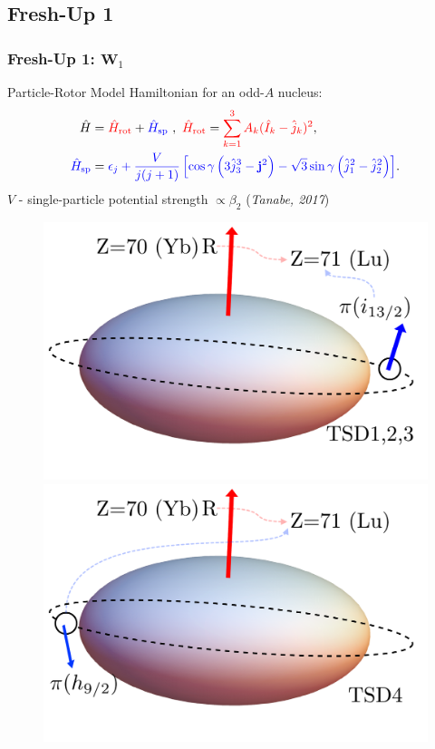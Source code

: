 \documentclass{beamer}
\begin{document}
\subsection{Fresh-Up 1}

\begin{frame}
	\frametitle{Fresh-Up 1: $\mathbf{W}_1$}
	\vspace{-0.1cm}
	Particle-Rotor Model Hamiltonian for an odd-$A$ nucleus:	
	\vspace{-0.28cm}
	\begin{align}
		\hat{H}&={\color{red}\hat{H}_\text{rot}}+{\color{blue}\hat{H}_\text{sp}}\ ,\ {\color{red}\hat{H}_\text{rot}}={\color{red}\sum_{k=1}^3A_k(\hat{I}_k-\hat{j}_k)^2},\nonumber\\
		{\color{blue}\hat{H}_\text{sp}}&={\color{blue}\epsilon_j+\frac{V}{j(j+1)}\left[\cos\gamma\left(3\hat{j}_3^3-\mathbf{j}^2\right)-\sqrt{3}\sin\gamma\left(\hat{j}_1^2-\hat{j}_2^2\right)\right]}.\nonumber
	\end{align}
	\vspace{-0.3cm}
	$V$ - single-particle potential strength $\propto\beta_2$ (\textit{Tanabe, 2017})
	\begin{figure}
		\centering
		\includegraphics[scale=0.22]{figures/triaxial-shapes-oddA-1.pdf}
		\includegraphics[scale=0.22]{figures/triaxial-shapes-oddA-2.pdf}

\end{figure}
\end{frame}
\end{document}

